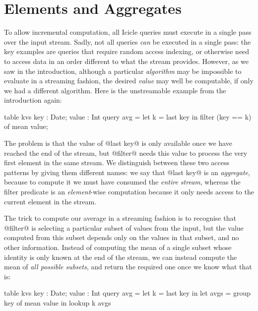 
\section{Elements and Aggregates}
\label{icicle:s:ElementsAndAggregates}
To allow incremental computation, all Icicle queries must execute in a single pass over the input stream.
Sadly, not all queries \emph{can} be executed in a single pass: the key examples are queries that require random access indexing, or otherwise need to access data in an order different to what the stream provides.
However, as we saw in the introduction, although a particular \emph{algorithm} may be impossible to evaluate in a streaming fashion, the desired \emph{value} may well be computable, if only we had a different algorithm.
Here is the unstreamable example from the introduction again:
\begin{icicle}
  table kvs { key : Date; value : Int }
  query avg = let k = last key
              in  filter (key == k) of mean value;
\end{icicle}

The problem is that the value of @last key@ is only available once we have reached the end of the stream, but @filter@ needs this value to process the very first element in the same stream.
We distinguish between these two access patterns by giving them different names: we say that @last key@ is an \emph{aggregate}, because to compute it we must have consumed the \emph{entire stream}, whereas the filter predicate is an \emph{element}-wise computation because it only needs access to the current element in the stream.

The trick to compute our average in a streaming fashion is to recognise that @filter@ is selecting a particular subset of values from the input, but the value computed from this subset depends only on the values in that subset, and no other information. Instead of computing the mean of a single subset whose identity is only known at the end of the stream, we can instead compute the mean of \emph{all possible subsets}, and return the required one once we know what that is:
\begin{icicle}
  table kvs { key : Date; value : Int } 
  query avg = let k    = last  key in
              let avgs = group key of mean value
              in  lookup k avgs
\end{icicle}

